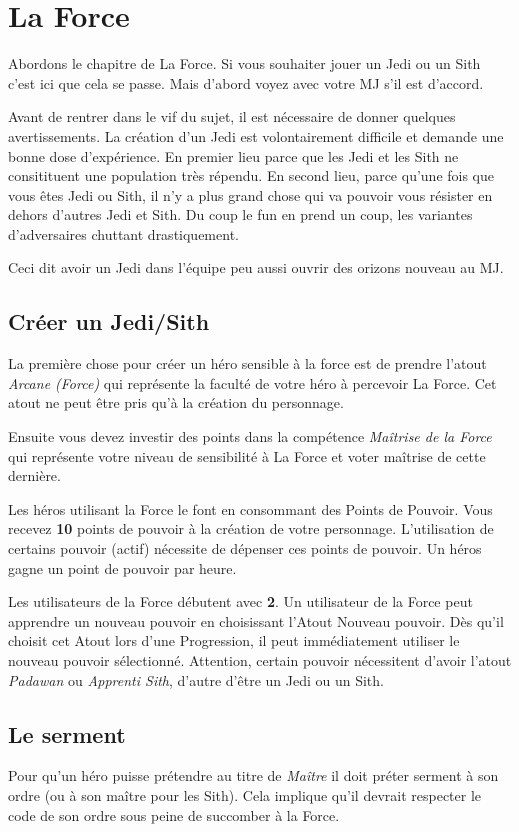 \section{La Force}
\label{sec:force}

Abordons le chapitre de La Force. Si vous souhaiter jouer un Jedi ou un Sith c’est ici que cela se passe. Mais d’abord voyez avec votre MJ s’il est d’accord.

Avant de rentrer dans le vif du sujet, il est nécessaire de donner quelques avertissements. La création d’un Jedi est volontairement difficile et demande une bonne dose d’expérience. En premier lieu parce que les Jedi et les Sith ne consitituent une population très répendu. En second lieu, parce qu’une fois que vous êtes Jedi ou Sith, il n’y a plus grand chose qui va pouvoir vous résister en dehors d’autres Jedi et Sith. Du coup le fun en prend un coup, les variantes d’adversaires chuttant drastiquement.

Ceci dit avoir un Jedi dans l’équipe peu aussi ouvrir des orizons nouveau au MJ.

\subsection{Créer un Jedi/Sith}
La première chose pour créer un héro sensible à la force est de prendre l’atout \emph{Arcane (Force)} qui représente la faculté de votre héro à percevoir La Force. Cet atout ne peut être pris qu'à la création du personnage.

Ensuite vous devez investir des points dans la compétence \emph{Maîtrise de la Force} qui représente votre niveau de sensibilité à La Force et voter maîtrise de cette dernière.

Les héros utilisant la Force le font en consommant des Points de Pouvoir. Vous recevez \textbf{10} points de pouvoir à la création de votre personnage. L’utilisation de certains pouvoir (actif) nécessite de dépenser ces points de pouvoir. Un héros gagne un point de pouvoir par heure.

Les utilisateurs de la Force débutent avec \textbf{2}. Un utilisateur de la Force peut apprendre un nouveau pouvoir en choisissant l’Atout Nouveau pouvoir. Dès qu’il choisit cet Atout lors d’une Progression, il peut immédiatement utiliser le nouveau pouvoir sélectionné. Attention, certain pouvoir nécessitent d'avoir l'atout \emph{Padawan} ou \emph{Apprenti Sith}, d'autre d'être un Jedi ou un Sith.

\subsection{Le serment}
Pour qu'un héro puisse prétendre au titre de \emph{Maître} il doit préter serment à son ordre (ou à son maître pour les Sith). Cela implique qu'il devrait respecter le code de son ordre sous peine de succomber à la Force.

